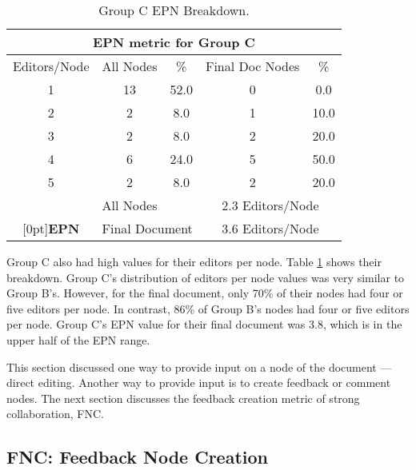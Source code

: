 \small
\begin{table}[htb]
  \caption{Group C EPN Breakdown.}
  \begin{center}
    \begin{tabular}{|c|c|c|c|c|}
      \hline
      \multicolumn{5}{|c|}{\rule[-3mm]{0mm}{8mm}\bf EPN metric for Group C }\\ \hline
      Editors/Node&All Nodes&\%&Final Doc Nodes&\%\\ \hline
      \hline
      1&13&52.0&0&0.0\\ \hline
      2&2&8.0&1&10.0\\ \hline
      3&2&8.0&2&20.0\\ \hline
      4&6&24.0&5&50.0\\\hline 
      5&2&8.0&2&20.0\\\hline
      \hline
      &\multicolumn{2}{|l|}{All Nodes}&\multicolumn{2}{|c|}{2.3
      Editors/Node}\\ \cline{2-5} 
      \raisebox{1.5ex}[0pt]{\bf EPN}&\multicolumn{2}{|l|}{Final
      Document}&\multicolumn{2}{|c|}{3.6 Editors/Node}\\\hline
    \end{tabular}
  \end{center}
  \label{tab:Na-editing}
\end{table}
\normalsize

Group C also had high values for their editors per node.  Table
\ref{tab:Na-editing} shows their breakdown.  Group C's distribution of
editors per node values was very similar to Group B's.  However, for the
final document, only 70\% of their nodes had four or five editors per node.
In contrast, 86\% of Group B's nodes had four or five editors per node.
Group C's EPN value for their final document was 3.8, which is in the
upper half of the EPN range.


This section discussed one way to provide input on a node of the document ---
direct editing.  Another way to provide input is to create feedback or
comment nodes.  The next section discusses the feedback creation metric of strong
collaboration, FNC.

\subsection{FNC: Feedback Node Creation}

